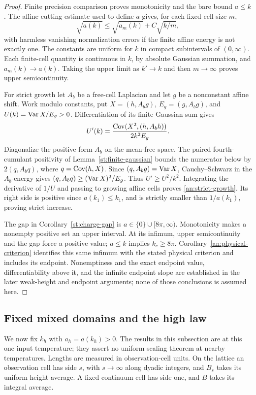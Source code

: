 \begin{proof}
Finite precision comparison proves monotonicity and the bare
bound $a\le k$.  The affine cutting estimate used to define
$a$ gives, for each fixed cell size $m$,
\[
 \sqrt{a(k)}\le\sqrt{a_m(k)}+C\sqrt{k/m},
\]
with harmless vanishing normalization errors if the finite
affine energy is not exactly one.  The constants are uniform
for $k$ in compact subintervals of $(0,\infty)$.
Each finite-cell quantity is continuous in $k$, by absolute
Gaussian summation, and $a_m(k)\to a(k)$.  Taking the
upper limit as $k'\to k$ and then $m\to\infty$ proves upper
semicontinuity.

For strict growth let $A_b$ be a free-cell Laplacian and let
$g$ be a nonconstant affine shift.  Work modulo constants,
put $X=(h,A_bg)$, $E_g=(g,A_bg)$, and
$U(k)=\operatorname{Var} X/E_g>0$.  Differentiation of its finite Gaussian
sum gives
\[
 U'(k)=\frac{\operatorname{Cov}(X^2,(h,A_bh))}{2k^2E_g}.
\]
Diagonalize the positive form $A_b$ on the mean-free space.
The paired fourth-cumulant positivity of
Lemma~\ref{st:finite-gaussian} bounds the numerator below
by $2(q,A_bq)$, where $q=\operatorname{Cov}(h,X)$.
Since $(q,A_bg)=\operatorname{Var} X$, Cauchy--Schwarz in the
$A_b$-energy gives $(q,A_bq)\ge(\operatorname{Var} X)^2/E_g$.
Thus $U'\ge U^2/k^2$.  Integrating the derivative of $1/U$
and passing to growing affine cells proves
\eqref{an:strict-growth}.  Its right side is positive since
$a(k_1)\le k_1$, and is strictly smaller than $1/a(k_1)$,
proving strict increase.

The gap in Corollary~\ref{st:charge-gap} is
$a\in\{0\}\cup[8\pi,\infty)$.  Monotonicity makes a
nonempty positive set an upper interval.  At its infimum,
upper semicontinuity and the gap force a positive value;
$a\le k$ implies $k_c\ge8\pi$.
Corollary~\ref{an:physical-criterion} identifies this same
infimum with the stated physical criterion and includes its
endpoint.  Nonemptiness and the exact endpoint value,
differentiability above it, and the infinite endpoint slope
are established in the later weak-height and endpoint
arguments; none of those conclusions is assumed here.
\end{proof}

\subsection{Fixed mixed domains and the high law}

We now fix $k_h$ with $a_h=a(k_h)>0$.  The results in this
subsection are at this one input temperature; they assert no
uniform scaling theorem at nearby temperatures.  Lengths are
measured in observation-cell units.  On the lattice an
observation cell has side $s$, with $s\to\infty$ along dyadic
integers, and $B_s$ takes its uniform height average.  A fixed
continuum cell has side one, and $B$ takes its integral average.


